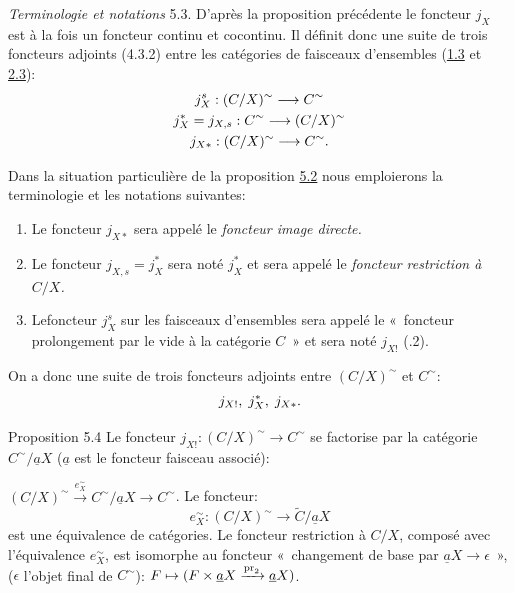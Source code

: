 \documentclass[10pt]{../fichiers-configuration-latex/smfart}
\begin{document}
\noindent \emph{Terminologie et notations} 5.3. D'après la
proposition précédente le foncteur $j_X$ est à la fois un
foncteur continu et cocontinu. Il définit donc une suite de
trois foncteurs adjoints (4.3.2) entre les catégories de
faisceaux d'ensembles (\hyperref[III.prop1.3]{1.3} et \hyperref[III.prop2.3]{2.3}):
\begin{gather*}
j^s_X:(C/X)^{\sim}\longrightarrow
C^{\sim}\\
j^{\ast}_X=j_{X,s}:C^{\sim}\longrightarrow
(C/X)^{\sim}\\
j_{X\ast}:(C/X)^{\sim}\longrightarrow C^{\sim}{}.
\end{gather*}

Dans la situation particulière de la proposition \hyperref[III.prop5.2]{5.2}
nous emploierons la terminologie et les notations suivantes:
\begin{enumerate}
\renewcommand{\labelenumi}{\theenumi)}
\item Le foncteur $j_{X\ast}$ sera appelé le \emph{foncteur image
directe.}

\item Le foncteur $j_{X,s}=j^{\ast}_X$ sera noté $j^{\ast}_X$ et
sera appelé le \emph{foncteur restriction à $C/X$.}

\item Le\pageoriginale foncteur $j^s_X$ sur les faisceaux d'ensembles
sera appelé le « foncteur prolongement par le vide à la
catégorie $C$ » et sera noté $j_{X!}$ (.2).
\end{enumerate}

On a donc une suite de trois foncteurs adjoints entre $(C/X)^{\sim}$
et $C^{\sim}$:
$$
j_{X!},\; j^{\ast}_X,\; j_{X\ast}{}.
$$

\begin{enonce*}{Proposition 5.4}
Le foncteur $j_{X!}:(C/X)^{\sim}\rightarrow C^{\sim}$ se factorise
par la catégorie $C^{\sim}/\underline{a}X$ ($\underline{a}$ est le
foncteur faisceau associé):

$(C/X)^{\sim}\xrightarrow{e^{\sim}_X} C^{\sim}/\underline{a}X\rightarrow
C^{\sim}$. Le foncteur:
$$
e^{\sim}_X:(C/X)^{\sim}\longrightarrow \widetilde{C}/\underline{a}X
$$
est une équivalence de catégories. Le foncteur restriction
à $C/X$, composé avec l'équivalence $e^{\sim}_X$, est
isomorphe au foncteur « changement de base par
$\underline{a}X\rightarrow \epsilon$ », ($\epsilon$ l'objet final de
$C^{\sim}$): $F\mapsto (F\times
\underline{a}X\xrightarrow{\operatorname{pr}_2}\underline{a}X)$.
\end{enonce*}
\end{document}
